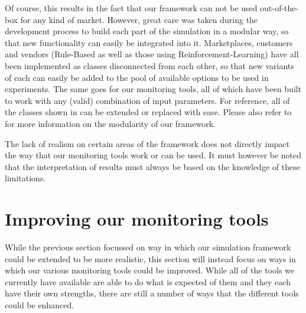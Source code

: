 Of course, this results in the fact that our framework can not be used out-of-the-box for any kind of market. However, great care was taken during the development process to build each part of the simulation in a modular way, so that new functionality can easily be integrated into it. Marketplaces, customers and vendors (Rule-Based as well as those using Reinforcement-Learning) have all been implemented as classes disconnected from each other, so that new variants of each can easily be added to the pool of available options to be used in experiments. The same goes for our monitoring tools, all of which have been built to work with any (valid) combination of input parameters. For reference, all of the classes shown in  can be extended or replaced with ease. Please also refer to \cite{LeoThesis} for more information on the modularity of our framework.

The lack of realism on certain areas of the framework does not directly impact the way that our monitoring tools work or can be used. It must however be noted that the interpretation of results must always be based on the knowledge of these limitations.

\section{Improving our monitoring tools}

While the previous section focussed on way in which our simulation framework could be extended to be more realistic, this section will instead focus on ways in which our various monitoring tools could be improved. While all of the tools we currently have available are able to do what is expected of them and they each have their own strengths, there are still a number of ways that the different tools could be enhanced.



